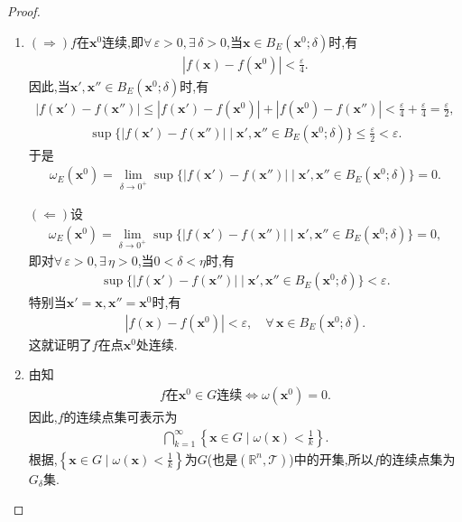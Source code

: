 \documentclass[../../main.tex]{subfiles}%
\begin{document}
\begin{proof}
\begin{enumerate}[(1)]
\item $(\Rightarrow)$$f$在$\boldsymbol{x}^0$连续,即$\forall\,\varepsilon>0,\exists\,\delta>0$,当$\boldsymbol{x}\in B_E(\boldsymbol{x}^0;\delta)$时,有
\begin{align*}
|f(\boldsymbol{x})-f(\boldsymbol{x}^0)|<\frac{\varepsilon}{4}.
\end{align*}
因此,当$\boldsymbol{x}',\boldsymbol{x}''\in B_E(\boldsymbol{x}^0;\delta)$时,有
\begin{align*}
|f(\boldsymbol{x}')-f(\boldsymbol{x}'')|\leqslant|f(\boldsymbol{x}')-f(\boldsymbol{x}^0)|+|f(\boldsymbol{x}^0)-f(\boldsymbol{x}'')|<\frac{\varepsilon}{4}+\frac{\varepsilon}{4}=\frac{\varepsilon}{2},
\end{align*}
\begin{align*}
\sup\{|f(\boldsymbol{x}')-f(\boldsymbol{x}'')|\mid \boldsymbol{x}',\boldsymbol{x}''\in B_E(\boldsymbol{x}^0;\delta)\}\leqslant\frac{\varepsilon}{2}<\varepsilon.
\end{align*}
于是
\begin{align*}
\omega_E(\boldsymbol{x}^0)=\lim\limits_{\delta\to0^+}\sup\{|f(\boldsymbol{x}')-f(\boldsymbol{x}'')|\mid \boldsymbol{x}',\boldsymbol{x}''\in B_E(\boldsymbol{x}^0;\delta)\}=0.
\end{align*}

$(\Leftarrow)$设
\begin{align*}
\omega_E(\boldsymbol{x}^0)=\lim\limits_{\delta\to0^+}\sup\{|f(\boldsymbol{x}')-f(\boldsymbol{x}'')|\mid \boldsymbol{x}',\boldsymbol{x}''\in B_E(\boldsymbol{x}^0;\delta)\}=0,
\end{align*}
即对$\forall\,\varepsilon>0,\exists\,\eta>0$,当$0<\delta<\eta$时,有
\begin{align*}
\sup\{|f(\boldsymbol{x}')-f(\boldsymbol{x}'')|\mid \boldsymbol{x}',\boldsymbol{x}''\in B_E(\boldsymbol{x}^0;\delta)\}<\varepsilon.
\end{align*}
特别当$\boldsymbol{x}'=\boldsymbol{x},\boldsymbol{x}''=\boldsymbol{x}^0$时,有
\begin{align*}
|f(\boldsymbol{x})-f(\boldsymbol{x}^0)|<\varepsilon,\quad \forall\,\boldsymbol{x}\in B_E(\boldsymbol{x}^0;\delta).
\end{align*}
这就证明了$f$在点$\boldsymbol{x}^0$处连续.

\item 由知
\begin{align*}
f\text{在}\boldsymbol{x}^0\in G\text{连续}\iff \omega(\boldsymbol{x}^0)=0.
\end{align*}
因此,$f$的连续点集可表示为
\begin{align*}
\bigcap\limits_{k=1}^{\infty}\left\{\boldsymbol{x}\in G\mid \omega(\boldsymbol{x})<\frac{1}{k}\right\}.
\end{align*}
根据,$\left\{\boldsymbol{x}\in G\mid \omega(\boldsymbol{x})<\frac{1}{k}\right\}$为$G$(也是$(\mathbb{R}^n,\mathscr{T})$)中的开集,所以$f$的连续点集为$G_{\delta}$集.


\end{enumerate}
\end{proof}
\end{document}
